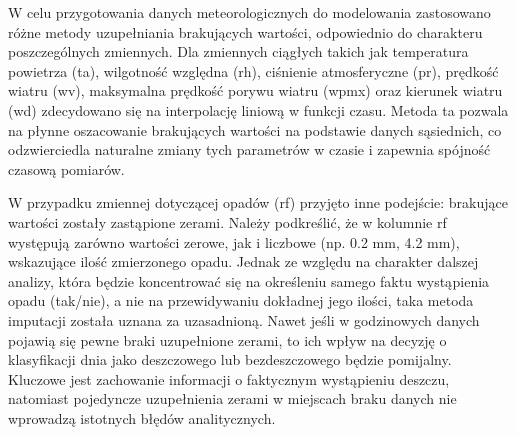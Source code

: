 \documentclass[10pt,a4paper]{article}
\begin{document}
W celu przygotowania danych meteorologicznych do modelowania zastosowano różne metody uzupełniania brakujących wartości, odpowiednio do charakteru poszczególnych zmiennych. Dla zmiennych ciągłych takich jak temperatura powietrza (ta), wilgotność względna (rh), ciśnienie atmosferyczne (pr), prędkość wiatru (wv), maksymalna prędkość porywu wiatru (wpmx) oraz kierunek wiatru (wd) zdecydowano się na interpolację liniową w funkcji czasu. Metoda ta pozwala na płynne oszacowanie brakujących wartości na podstawie danych sąsiednich, co odzwierciedla naturalne zmiany tych parametrów w czasie i zapewnia spójność czasową pomiarów.
\par
\hspace{0.75cm}
W przypadku zmiennej dotyczącej opadów (rf) przyjęto inne podejście: brakujące wartości zostały zastąpione zerami. Należy podkreślić, że w kolumnie rf występują zarówno wartości zerowe, jak i liczbowe (np. 0.2 mm, 4.2 mm), wskazujące ilość zmierzonego opadu. Jednak ze względu na charakter dalszej analizy, która będzie koncentrować się na określeniu samego faktu wystąpienia opadu (tak/nie), a nie na przewidywaniu dokładnej jego ilości, taka metoda imputacji została uznana za uzasadnioną. Nawet jeśli w godzinowych danych pojawią się pewne braki uzupełnione zerami, to ich wpływ na decyzję o klasyfikacji dnia jako deszczowego lub bezdeszczowego będzie pomijalny. Kluczowe jest zachowanie informacji o faktycznym wystąpieniu deszczu, natomiast pojedyncze uzupełnienia zerami w miejscach braku danych nie wprowadzą istotnych błędów analitycznych.
\end{document}
